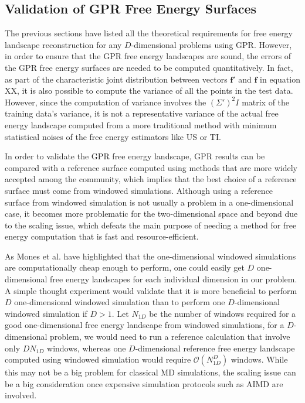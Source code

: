 \begin{spacing}{2.0}
    \section{Validation of GPR Free Energy Surfaces}

    The previous sections have listed all the theoretical requirements for free energy landscape reconstruction for any $D$-dimensional problems 
    using GPR. However, in order to ensure that the GPR free energy landscapes are sound, the errors of the GPR free energy surfaces are needed
    to be computed quantitatively. In fact, as part of the characteristic joint distribution between vectors $\mathbf{f}'$ and $\mathbf{f}$ in
    equation XX, it is also possible to compute the variance of all the points in the test data. \cite{W-Stanford-GPR} However, since the 
    computation of variance involves the $(\Sigma')^2 I$ matrix of the training data's variance, it is not a representative variance of the 
    actual free energy landscape computed from a more traditional method with minimum statistical noises of the free energy estimators like US
    or TI. 

    In order to validate the GPR free energy landscape, GPR results can be compared with a reference surface computed using methods that are
    more widely accepted among the community, which implies that the best choice of a reference surface must come from windowed simulations. 
    Although using a reference surface from windowed simulation is not usually a problem in a one-dimensional case, it becomes more problematic
    for the two-dimensional space and beyond due to the scaling issue, which defeats the main purpose of needing a method for free energy
    computation that is fast and resource-efficient. 

    As Mones et al. have highlighted that the one-dimensional windowed simulations are computationally cheap enough to perform, one could easily
    get $D$ one-dimensional free energy landscapes for each individual dimension in our problem. A simple thought experiment would validate that
    it is more beneficial to perform $D$ one-dimensional windowed simulation than to perform one $D$-dimensional windowed simulation if $D > 1$.
    Let $N_{1D}$ be the number of windows required for a good one-dimensional free energy landscape from windowed simulations, for a $D$-dimensional
    problem, we would need to run a reference calculation that involve only $DN_{1D}$ windows, whereas one $D$-dimensional reference free energy
    landscape computed using windowed simulation would require $\mathcal{O}(N_{1D}^D)$ windows. While this may not be a big problem for classical
    MD simulations, the scaling issue can be a big consideration once expensive simulation protocols such as AIMD are involved.


\end{spacing}
